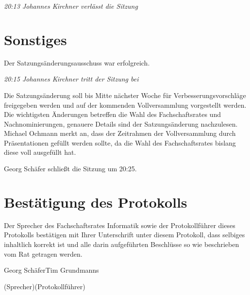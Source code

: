 \documentclass[a4paper, 11pt]{article} %
\newcommand{\protokoller}{Tim Grundmanns}
\newcommand{\fsiPresident}{Georg Schäfer}
\begin{document}
\begin{center}
\textit{20:13 Johannes Kirchner verlässt die Sitzung}
\end{center}

\pagebreak
\section{Sonstiges}
Der Satzungsänderungsausschuss war erfolgreich.

\begin{center}
\textit{20:15 Johannes Kirchner tritt der Sitzung bei}
\end{center}

\begin{flushleft}
Die Satzungsänderung soll bis  Mitte nächster Woche für Verbesserungsvorschläge freigegeben werden und auf der kommenden Vollversammlung vorgestellt werden.\\
Die wichtigsten Änderungen betreffen die Wahl des Fachschaftsrates und Nachnominierungen, genauere Details sind der Satzungsänderung nachzulesen.\\
Michael Ochmann merkt an, dass der Zeitrahmen der Vollversammlung durch Präsentationen gefüllt werden sollte, da die Wahl des Fachschaftsrates bislang diese voll ausgefüllt hat.
\end{flushleft}
Georg Schäfer schließt die Sitzung um 20:25.


\pagebreak
\section{Bestätigung des Protokolls}
Der Sprecher des Fachschaftsrates Informatik sowie der Protokollführer dieses Protokolls bestätigen mit Ihrer Unterschrift unter diesem Protokoll, dass selbiges inhaltlich korrekt ist und alle darin aufgeführten Beschlüsse so wie beschrieben vom Rat getragen werden.
\\

\vspace{3.5cm}
\hrulefill \hfill \hrulefill

\fsiPresident \hfill \protokoller

{\footnotesize (Sprecher)\hfill (Protokollführer)}
\end{document}
